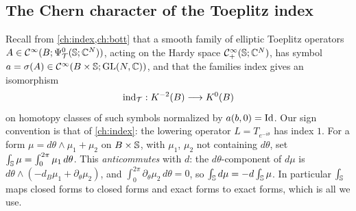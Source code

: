 \subsection{The Chern character of the Toeplitz index}
Recall from \cref{ch:index,ch:bott} that a smooth family of elliptic Toeplitz
operators $A\in\mathcal{C}^\infty(B;\Psi^0_{\mathcal T}(\mathbb{S};\mathbb{C}^N))$, acting on the Hardy
space $\mathcal{C}^\infty_{+}(\mathbb{S};\mathbb{C}^N)$, has symbol $a=\sigma(A)\in\mathcal{C}^\infty(B\times\mathbb{S};
\operatorname{GL}(N,\mathbb{C}))$, and that the families index gives an isomorphism
\begin{equation*}
  \operatorname{ind}_{\mathcal T}:K^{-2}(B)\longrightarrow K^0(B)
\end{equation*}
on homotopy classes of such symbols normalized by $a(b,0)=\operatorname{Id}$. Our sign
convention is that of \cref{ch:index}: the lowering operator
$L=T_{e^{-i\theta}}$ has index $1$. For a form $\mu=d\theta\wedge\mu_1+\mu_2$
on $B\times\mathbb{S}$, with $\mu_1$, $\mu_2$ not containing $d\theta$, set
$\int_{\mathbb{S}}\mu=\int_0^{2\pi}\mu_1\,d\theta$. This \emph{anticommutes}
with $d$: the $d\theta$-component of $d\mu$ is $d\theta\wedge(-d_B\mu_1+
\partial_\theta\mu_2)$, and $\int_0^{2\pi}\partial_\theta\mu_2\,d\theta=0$, so
$\int_{\mathbb{S}} d\mu=-d\int_{\mathbb{S}}\mu$. In particular $\int_{\mathbb{S}}$ maps closed
forms to closed forms and exact forms to exact forms, which is all we use.


